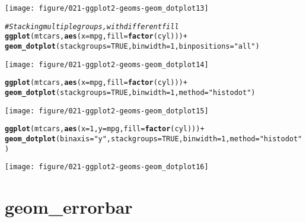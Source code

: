 \documentclass[a4paper,titlepage]{tufte-handout}\usepackage[]{graphicx}\usepackage[]{color}
\makeatletter
\def\maxwidth{ %
  \ifdim\Gin@nat@width>\linewidth
    \linewidth
  \else
    \Gin@nat@width
  \fi
}
\newcommand{\hlnum}[1]{\textcolor[rgb]{0.686,0.059,0.569}{#1}}%
\newcommand{\hlstr}[1]{\textcolor[rgb]{0.192,0.494,0.8}{#1}}%
\newcommand{\hlcom}[1]{\textcolor[rgb]{0.678,0.584,0.686}{\textit{#1}}}%
\newcommand{\hlopt}[1]{\textcolor[rgb]{0,0,0}{#1}}%
\newcommand{\hlstd}[1]{\textcolor[rgb]{0.345,0.345,0.345}{#1}}%
\newcommand{\hlkwc}[1]{\textcolor[rgb]{0.333,0.667,0.333}{#1}}%
\newcommand{\hlkwd}[1]{\textcolor[rgb]{0.737,0.353,0.396}{\textbf{#1}}}%
\newenvironment{kframe}{%
 \def\at@end@of@kframe{}%
 \ifinner\ifhmode%
  \def\at@end@of@kframe{\end{minipage}}%
  \begin{minipage}{\columnwidth}%
 \fi\fi%
 \def\FrameCommand##1{\hskip\@totalleftmargin \hskip-\fboxsep
 \colorbox{shadecolor}{##1}\hskip-\fboxsep
     \hskip-\linewidth \hskip-\@totalleftmargin \hskip\columnwidth}%
 \MakeFramed {\advance\hsize-\width
   \@totalleftmargin\z@ \linewidth\hsize
   \@setminipage}}%
 {\par\unskip\endMakeFramed%
 \at@end@of@kframe}
\newenvironment{knitrout}{}{} %
\makeatother
\begin{document}
\begin{knitrout}
\begin{kframe}
{\ttfamily\noindent\itshape\color{messagecolor}{\#\# stat\_bindot: binwidth defaulted to range/30. Use 'binwidth = x' to adjust this.}}\end{kframe}
\texttt{[image: figure/021-ggplot2-geoms-geom\_dotplot13]} 
\begin{kframe}\begin{alltt}
\hlcom{# Stacking multiple groups, with different fill}
\hlkwd{ggplot}\hlstd{(mtcars,} \hlkwd{aes}\hlstd{(}\hlkwc{x} \hlstd{= mpg,} \hlkwc{fill} \hlstd{=} \hlkwd{factor}\hlstd{(cyl)))} \hlopt{+}
  \hlkwd{geom_dotplot}\hlstd{(}\hlkwc{stackgroups} \hlstd{=} \hlnum{TRUE}\hlstd{,} \hlkwc{binwidth} \hlstd{=} \hlnum{1}\hlstd{,} \hlkwc{binpositions} \hlstd{=} \hlstr{"all"}\hlstd{)}
\end{alltt}
\end{kframe}
\texttt{[image: figure/021-ggplot2-geoms-geom\_dotplot14]} 
\begin{kframe}\begin{alltt}
\hlkwd{ggplot}\hlstd{(mtcars,} \hlkwd{aes}\hlstd{(}\hlkwc{x} \hlstd{= mpg,} \hlkwc{fill} \hlstd{=} \hlkwd{factor}\hlstd{(cyl)))} \hlopt{+}
  \hlkwd{geom_dotplot}\hlstd{(}\hlkwc{stackgroups} \hlstd{=} \hlnum{TRUE}\hlstd{,} \hlkwc{binwidth} \hlstd{=} \hlnum{1}\hlstd{,} \hlkwc{method} \hlstd{=} \hlstr{"histodot"}\hlstd{)}
\end{alltt}
\end{kframe}
\texttt{[image: figure/021-ggplot2-geoms-geom\_dotplot15]} 
\begin{kframe}\begin{alltt}
\hlkwd{ggplot}\hlstd{(mtcars,} \hlkwd{aes}\hlstd{(}\hlkwc{x} \hlstd{=} \hlnum{1}\hlstd{,} \hlkwc{y} \hlstd{= mpg,} \hlkwc{fill} \hlstd{=} \hlkwd{factor}\hlstd{(cyl)))} \hlopt{+}
  \hlkwd{geom_dotplot}\hlstd{(}\hlkwc{binaxis} \hlstd{=} \hlstr{"y"}\hlstd{,} \hlkwc{stackgroups} \hlstd{=} \hlnum{TRUE}\hlstd{,} \hlkwc{binwidth} \hlstd{=} \hlnum{1}\hlstd{,} \hlkwc{method} \hlstd{=} \hlstr{"histodot"}\hlstd{)}
\end{alltt}
\end{kframe}
\texttt{[image: figure/021-ggplot2-geoms-geom\_dotplot16]} 

\end{knitrout}


\section{geom\_errorbar}
\end{document}
